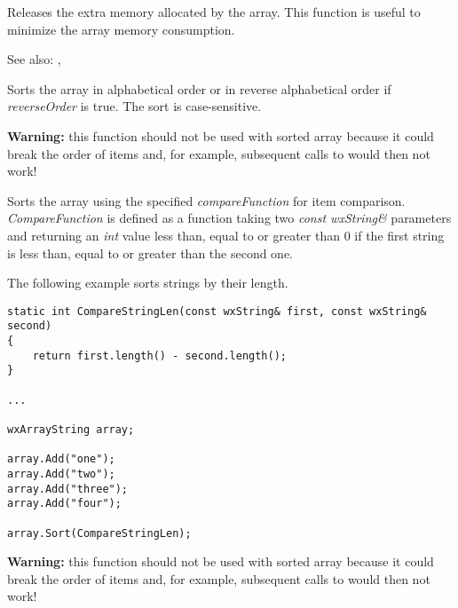 \label{wxarraystringshrink}


Releases the extra memory allocated by the array. This function is useful to
minimize the array memory consumption.

See also: , 

\label{wxarraystringsort}


Sorts the array in alphabetical order or in reverse alphabetical order if 
{\it reverseOrder} is true. The sort is case-sensitive.

{\bf Warning:} this function should not be used with sorted array because it
could break the order of items and, for example, subsequent calls to 
 would then not work!


Sorts the array using the specified {\it compareFunction} for item comparison.
{\it CompareFunction} is defined as a function taking two {\it const
wxString\&} parameters and returning an {\it int} value less than, equal to or
greater than 0 if the first string is less than, equal to or greater than the
second one.


The following example sorts strings by their length.

\begin{verbatim}
static int CompareStringLen(const wxString& first, const wxString& second)
{
    return first.length() - second.length();
}

...

wxArrayString array;

array.Add("one");
array.Add("two");
array.Add("three");
array.Add("four");

array.Sort(CompareStringLen);
\end{verbatim}

{\bf Warning:} this function should not be used with sorted array because it
could break the order of items and, for example, subsequent calls to 
 would then not work!

